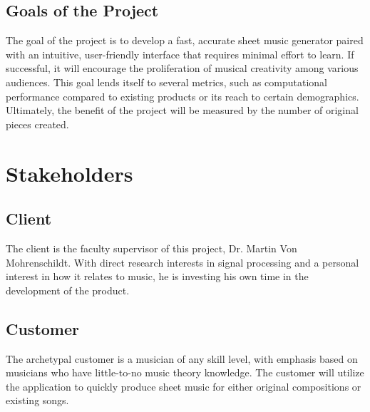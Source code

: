 \documentclass[12pt]{article}
\begin{document}
\subsection{Goals of the Project}
The goal of the project is to develop a fast, accurate sheet music generator 
paired with an intuitive, user-friendly interface that requires minimal effort 
to learn. If successful, it will encourage the proliferation of musical creativity 
among various audiences. This goal lends itself to several metrics, such as 
computational performance compared to existing products or its reach to certain 
demographics. Ultimately, the benefit of the project will be measured by the number 
of original pieces created.
\section{Stakeholders}
\subsection{Client}
The client is the faculty supervisor of this project, Dr. Martin Von Mohrenschildt. With direct research interests in signal processing and a personal interest in how it relates to 
music, he is investing his own time in the development of the product.
\subsection{Customer}
The archetypal customer is a musician of any skill level, with emphasis based on musicians who have little-to-no music theory knowledge. The customer will utilize the application 
to quickly produce sheet music for either original compositions or existing songs. 
\end{document}
